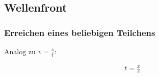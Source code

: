 \subsection{Wellenfront}

\subsubsection{Erreichen eines beliebigen Teilchens}

Analog zu $v=\frac{s}{t}$:

\begin{align}
	t=\frac{x}{c}
\end{align}